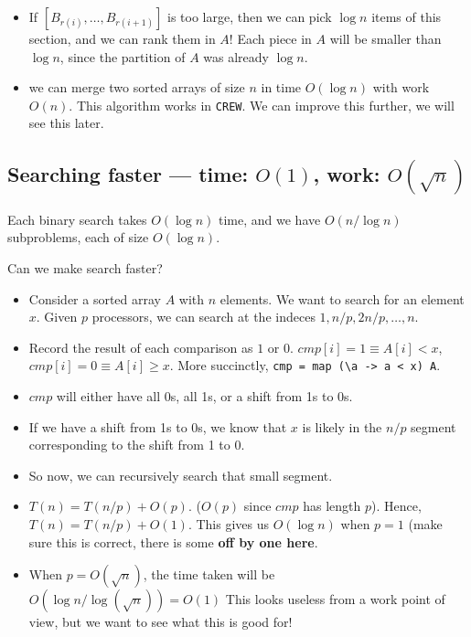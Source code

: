 \begin{itemize}
    \item If $[B_{r(i)}, \dots, B_{r(i + 1)}]$ is too large, then we can
        pick $\log n$ items of this section, and we can rank them in $A$!
        Each piece in $A$ will be smaller than $\log n$, since the partition
        of $A$ was already $\log n$.

    \item we can merge two sorted arrays of size $n$ in time $O(\log n)$
        with work $O(n)$.  This algorithm works in \texttt{CREW}.
        We can improve this  further, we will see this later.
\end{itemize}

\subsection{Searching faster --- time: $O(1)$, work: $O(\sqrt n)$}

Each binary search takes $O(\log n)$ time, and we have $O(n / \log n)$ subproblems,
each of size $O(\log n)$. 

Can we make search faster?

\begin{itemize}
    \item Consider a sorted array $A$ with $n$ elements. We want to search
        for an element $x$.
        Given $p$ processors, we can search at the indeces $1, n / p, 2n/p, \dots, n$.

    \item Record the result of each comparison as $1$ or $0$.
        $cmp[i] = 1 \equiv A[i] < x$, $cmp[i] = 0 \equiv A[i] \geq x$.
        More succinctly, \verb|cmp = map (\a -> a < x) A|.

    \item $cmp$ will either have all 0s, all 1s, or a shift from 1s to 0s.

    \item If we have a shift from 1s to 0s, we know that $x$ is likely
        in the $n/p$ segment corresponding to the shift from 1 to 0.

    \item So now, we can recursively search that small segment.

    \item $T(n) = T(n / p) + O(p)$. ($O(p)$ since $cmp$ has length $p$).
        Hence, $T(n) = T(n / p) + O(1)$. This gives us $O(\log n)$ when $p = 1$
        (make sure this is correct, there is some \textbf{off by one here}.

    \item When $p = O(\sqrt n)$, the time taken will be $O(\log n / \log (\sqrt n)) = O(1)$
        This looks useless from a work point of view, but we want to see what this is
        good for!
\end{itemize}

